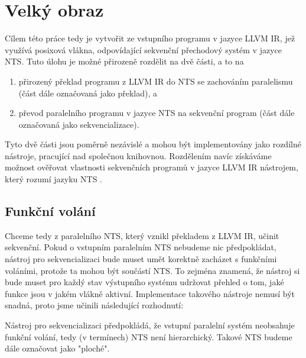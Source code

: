 \documentclass[10pt,a4paper,notitlepage]{report}
\begin{document}
\section{Velký obraz}
Cílem této práce tedy je vytvořit ze vstupního programu v jazyce LLVM IR, jež využívá posixová vlákna, odpovídající sekvenční přechodový systém v jazyce NTS. Tuto úlohu je možné přirozeně rozdělit na dvě části, a to na
\begin{enumerate}
\item přirozený překlad programu z LLVM IR do NTS se zachováním paralelismu (část dále označovaná jako překlad), a
\item převod paralelního programu v jazyce NTS na sekvenční program (část dále označovaná jako sekvencializace).
\end{enumerate}

Tyto dvě části jsou poměrně nezávislé a mohou být implementovány jako rozdílné nástroje, pracující nad společnou knihovnou. Rozdělením navíc získáváme možnost ověřovat vlastnosti sekvenčních programů v jazyce LLVM IR nástrojem, který rozumí jazyku NTS .




\subsection{Funkční volání} %

Chceme tedy z paralelního NTS, který vznikl překladem z LLVM IR, učinit sekvenční. Pokud o vstupním paralelním NTS nebudeme nic předpokládat, nástroj pro sekvencializaci bude muset umět korektně zacházet s funkčními voláními, protože ta mohou být součástí NTS. To zejména znamená, že nástroj si bude muset pro každý stav výstupního systému udržovat přehled o tom, jaké funkce jsou v jakém vlákně aktivní. Implementace takového nástroje nemusí být snadná, proto jsme učinili následující rozhodnutí:

Nástroj pro sekvencializaci předpokládá, že vstupní paralelní systém neobsahuje funkční volání, tedy (v termínech) NTS není hierarchický. Takové NTS budeme dále označovat jako "ploché".
\end{document}
